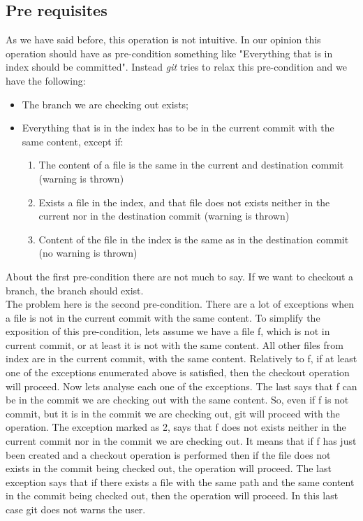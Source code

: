 \subsection{Pre requisites}
\label{sec:checkout:pre}
As we have said before, this operation is not intuitive. In our
opinion this operation should have as pre-condition something like
"Everything that is in index should be committed". Instead \emph{git}
tries to relax this pre-condition and we have the following:
\begin{itemize}
   \item The branch we are checking out exists;
   \item Everything that is in the index has to be in the current commit with the
      same content, except if:
      \begin{enumerate}
         \item The content of a file is the same in the
         current and destination commit (warning is thrown)
         \item Exists a file in the index, and that file does not exists
         neither in the current nor in the destination commit (warning is thrown)
         \item Content of the file in the index is the same as in the
         destination commit (no warning is thrown)
      \end{enumerate}
\end{itemize}

About the first pre-condition there are not much to say. If we want to
checkout a branch, the branch should exist.\\

The problem here is the second pre-condition. There are a lot of
exceptions when a file is not in the current commit with the same
content. To simplify the exposition of this pre-condition, lets assume
we have a file f, which is not in current commit, or at least it is not
with the same content. All other files from index are in the current commit, with
the same content. Relatively to f, if at least one of the exceptions enumerated above
is satisfied, then the checkout operation will proceed. Now lets
analyse each one of the exceptions. The last says that f can 
be in the commit we are checking out with the same content. So, even
if f is not commit, but it is in the commit we are checking out, git
will proceed with the operation. The exception marked as 2, says that
f does not exists neither in the current commit nor in the commit we
are checking out. It means that if f has just been created and a
checkout operation is performed then if the file does not exists in
the commit being checked out, the operation will proceed. The last
exception says that if there exists a file with the same path and the
same content in the commit being checked out, then the operation will
proceed. In this last case git does not warns the user.

